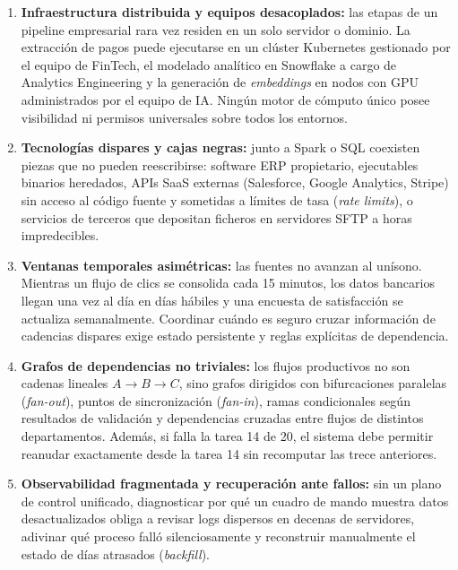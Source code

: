 \begin{enumerate}
  \item \textbf{Infraestructura distribuida y equipos desacoplados:} las etapas de un pipeline empresarial rara vez residen en un solo servidor o dominio. La extracción de pagos puede ejecutarse en un clúster Kubernetes gestionado por el equipo de FinTech, el modelado analítico en Snowflake a cargo de Analytics Engineering y la generación de \textit{embeddings} en nodos con GPU administrados por el equipo de IA. Ningún motor de cómputo único posee visibilidad ni permisos universales sobre todos los entornos.
  \item \textbf{Tecnologías dispares y cajas negras:} junto a Spark o SQL coexisten piezas que no pueden reescribirse: software ERP propietario, ejecutables binarios heredados, APIs SaaS externas (Salesforce, Google Analytics, Stripe) sin acceso al código fuente y sometidas a límites de tasa (\textit{rate limits}), o servicios de terceros que depositan ficheros en servidores SFTP a horas impredecibles.
  \item \textbf{Ventanas temporales asimétricas:} las fuentes no avanzan al unísono. Mientras un flujo de clics se consolida cada 15 minutos, los datos bancarios llegan una vez al día en días hábiles y una encuesta de satisfacción se actualiza semanalmente. Coordinar cuándo es seguro cruzar información de cadencias dispares exige estado persistente y reglas explícitas de dependencia.
  \item \textbf{Grafos de dependencias no triviales:} los flujos productivos no son cadenas lineales $A \to B \to C$, sino grafos dirigidos con bifurcaciones paralelas (\textit{fan-out}), puntos de sincronización (\textit{fan-in}), ramas condicionales según resultados de validación y dependencias cruzadas entre flujos de distintos departamentos. Además, si falla la tarea 14 de 20, el sistema debe permitir reanudar exactamente desde la tarea 14 sin recomputar las trece anteriores.
  \item \textbf{Observabilidad fragmentada y recuperación ante fallos:} sin un plano de control unificado, diagnosticar por qué un cuadro de mando muestra datos desactualizados obliga a revisar logs dispersos en decenas de servidores, adivinar qué proceso falló silenciosamente y reconstruir manualmente el estado de días atrasados (\textit{backfill}).
\end{enumerate}

